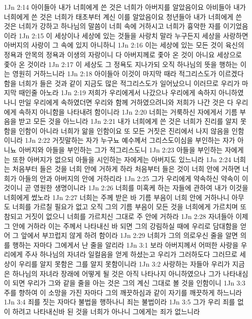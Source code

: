 1Jn 2:14  아이들아 내가 너희에게 쓴 것은 너희가 아버지를 알았음이요 아비들아 내가 너희에게 쓴 것은 너희가 태초부터 계신 이를 알았음이요 청년들아 내가 너희에게 쓴 것은 너희가 강하고 하나님의 말씀이 너희 속에 거하시고 너희가 흉악한 자를 이기었음이라
1Jn 2:15  이 세상이나 세상에 있는 것들을 사랑치 말라 누구든지 세상을 사랑하면 아버지의 사랑이 그 속에 있지 아니하니
1Jn 2:16  이는 세상에 있는 모든 것이 육신의 정욕과 안목의 정욕과 이생의 자랑이니 다 아버지께로 좇아 온 것이 아니요 세상으로 좇아 온 것이라
1Jn 2:17  이 세상도 그 정욕도 지나가되 오직 하나님의 뜻을 행하는 이는 영원히 거하느니라
1Jn 2:18  아이들아 이것이 마지막 때라 적그리스도가 이르겠다 함을 너희가 들은 것과 같이 지금도 많은 적그리스도가 일어났으니 이러므로 우리가 마지막 때인줄 아노라
1Jn 2:19  저희가 우리에게서 나갔으나 우리에게 속하지 아니하였나니 만일 우리에게 속하였더면 우리와 함께 거하였으려니와 저희가 나간 것은 다 우리에게 속하지 아니함을 나타내려 함이니라
1Jn 2:20  너희는 거룩하신 자에게서 기름 부음을 받고 모든 것을 아느니라
1Jn 2:21  내가 너희에게 쓴 것은 너희가 진리를 알지 못함을 인함이 아니라 너희가 앎을 인함이요 또 모든 거짓은 진리에서 나지 않음을 인함이니라
1Jn 2:22  거짓말하는 자가 누구뇨 예수께서 그리스도이심을 부인하는 자가 아니뇨 아버지와 아들을 부인하는 그가 적그리스도니
1Jn 2:23  아들을 부인하는 자에게는 또한 아버지가 없으되 아들을 시인하는 자에게는 아버지도 있느니라
1Jn 2:24  너희는 처음부터 들은 것을 너희 안에 거하게 하라 처음부터 들은 것이 너희 안에 거하면 너희가 아들의 안과 아버지의 안에 거하리라
1Jn 2:25  그가 우리에게 약속하신 약속이 이것이니 곧 영원한 생명이니라
1Jn 2:26  너희를 미혹케 하는 자들에 관하여 내가 이것을 너희에게 썼노라
1Jn 2:27  너희는 주께 받은 바 기름 부음이 너희 안에 거하나니 아무도 너희를 가르칠 필요가 없고 오직 그의 기름 부음이 모든 것을 너희에게 가르치며 또 참되고 거짓이 없으니 너희를 가르치신 그대로 주 안에 거하라
1Jn 2:28  자녀들아 이제 그 안에 거하라 이는 주께서 나타내신 바 되면 그의 강림하실 때에 우리로 담대함을 얻어 그 앞에서 부끄럽지 않게 하려 함이라
1Jn 2:29  너희가 그의 의로우신 줄을 알면 의를 행하는 자마다 그에게서 난 줄을 알리라
1Jn 3:1  보라 아버지께서 어떠한 사랑을 우리에게 주사 하나님의 자녀라 일컬음을 얻게 하셨는고 우리가 그러하도다 그러므로 세상이 우리를 알지 못함은 그를 알지 못함이니라
1Jn 3:2  사랑하는 자들아 우리가 지금은 하나님의 자녀라 장래에 어떻게 될 것은 아직 나타나지 아니하였으나 그가 나타내심이 되면 우리가 그와 같을 줄을 아는 것은 그의 계신 그대로 볼 것을 인함이니
1Jn 3:3  주를 향하여 이 소망을 가진 자마다 그의 깨끗하심과 같이 자기를 깨끗하게 하느니라
1Jn 3:4  죄를 짓는 자마다 불법을 행하나니 죄는 불법이라
1Jn 3:5  그가 우리 죄를 없이 하려고 나타내신바 된 것을 너희가 아나니 그에게는 죄가 없느니라
